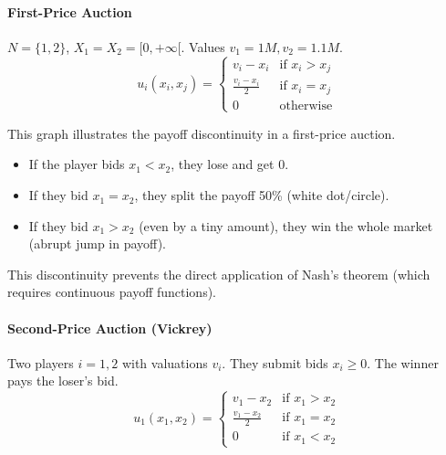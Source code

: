 \paragraph{First-Price Auction}
$N = \{1, 2\}$, $X_1 = X_2 = [0, +\infty[$. Values $v_1 = 1M, v_2 = 1.1M$.
$$u_i(x_i, x_j) = \begin{cases} v_i - x_i & \text{if } x_i > x_j \\ \frac{v_i - x_i}{2} & \text{if } x_i = x_j \\ 0 & \text{otherwise} \end{cases}$$

\begin{center}
\end{center}
\begin{figureexplanation}
This graph illustrates the payoff discontinuity in a first-price auction.
\begin{itemize}
    \item If the player bids $x_1 < x_2$, they lose and get 0.
    \item If they bid $x_1 = x_2$, they split the payoff 50\% (white dot/circle).
    \item If they bid $x_1 > x_2$ (even by a tiny amount), they win the whole market (abrupt jump in payoff).
\end{itemize}
This discontinuity prevents the direct application of Nash's theorem (which requires continuous payoff functions).
\end{figureexplanation}

\paragraph{Second-Price Auction (Vickrey)}
Two players $i=1,2$ with valuations $v_i$. They submit bids $x_i \ge 0$. The winner pays the loser's bid.
\[
u_1(x_1, x_2) = 
\begin{cases} 
v_1 - x_2 & \text{if } x_1 > x_2 \\
\frac{v_1 - x_2}{2} & \text{if } x_1 = x_2 \\
0 & \text{if } x_1 < x_2
\end{cases}
\]

